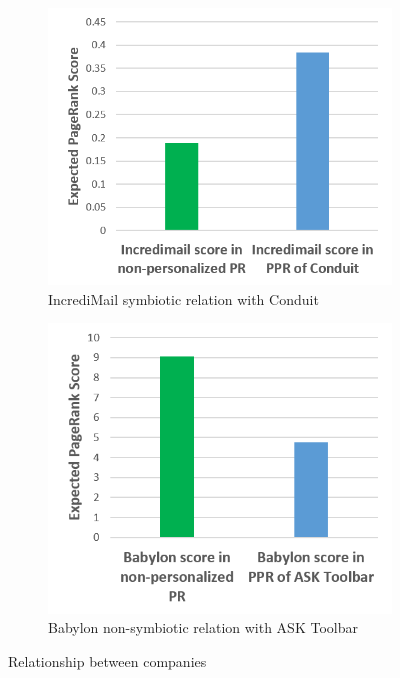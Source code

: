 \documentclass[11pt,oneside]{book}
\begin{document}
\begin{figure}[!htbp]
\centering
\begin{subfigure}[b]{0.8\textwidth}
	\centering
\includegraphics[scale=0.8]{figures/incredi_sym_conduit.png}
\caption{IncrediMail symbiotic relation with Conduit}
\label{fig:incredi_sym_conduit}
\end{subfigure}
\begin{subfigure}[b]{0.8\textwidth}
	\centering
\includegraphics[scale=0.8]{figures/babylon_nosym_ask.png}
\caption{Babylon non-symbiotic relation with ASK Toolbar}
\label{fig:babylon_nosym_ask}
\end{subfigure}
\caption{Relationship between companies}
	\label{fig:symbiotic_pagerank}
\end{figure}
\end{document}
